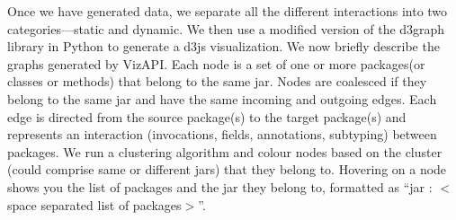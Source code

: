 \label{sec:vis-system}

Once we have generated data, we separate all the different interactions
into two categories---static and dynamic. We then use a modified version
of the d3graph  library in Python to generate a d3js  
visualization. We now briefly describe the graphs generated by VizAPI.
Each node is a set of one or more packages(or classes or methods) 
that belong to the same jar. Nodes are coalesced if they belong to the same 
jar and have the same incoming and outgoing edges. Each edge is directed 
from the source package(s) to the target package(s) and represents an interaction 
(invocations, fields, annotations, subtyping) between packages. We run a 
clustering algorithm and colour nodes based on the cluster 
(could comprise same or different jars) that they belong to. 
Hovering on a node shows you the list of packages and 
the jar they belong to, 
formatted as “jar : $<$space separated list of packages$>$”.
